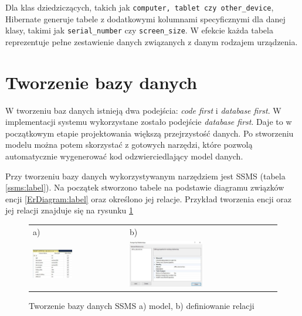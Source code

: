 Dla klas dziedziczących, takich jak \texttt{computer, tablet czy other\_device}, Hibernate generuje tabele z dodatkowymi kolumnami specyficznymi dla danej klasy, takimi jak \texttt{serial\_number} czy \texttt{screen\_size}. W efekcie każda tabela reprezentuje pełne zestawienie danych związanych z danym rodzajem urządzenia.



\section{Tworzenie bazy danych}
W tworzeniu baz danych istnieją dwa podejścia: \emph{code first} i \emph{database first}. W implementacji systemu wykorzystane zostało podejście \emph{database first}. Daje to w początkowym etapie projektowania większą przejrzystość danych. Po stworzeniu modelu można potem skorzystać z gotowych narzędzi, które pozwolą automatycznie wygenerować kod odzwierciedlający model danych.

Przy tworzeniu bazy danych wykorzystywanym narzędziem jest SSMS (tabela \ref{ssms:label}). Na początek stworzono tabele na podstawie diagramu związków encji \ref{ErDiagram:label} oraz określono jej relacje. Przykład tworzenia encji oraz jej relacji znajduje się na rysunku \ref{ssms_tworzenie:label}

\begin{figure}[htb]
  \centering
	\begin{tabular}{@{}ll@{}}
	a) & b) \\
  \includegraphics[width=0.445\textwidth]{rys04/design.pdf} & 
	\includegraphics[width=0.505\textwidth]{rys04/relation.pdf}
	\end{tabular}
  \caption{Tworzenie bazy danych SSMS a) model, b) definiowanie relacji}
  \label{ssms_tworzenie:label}
\end{figure}


